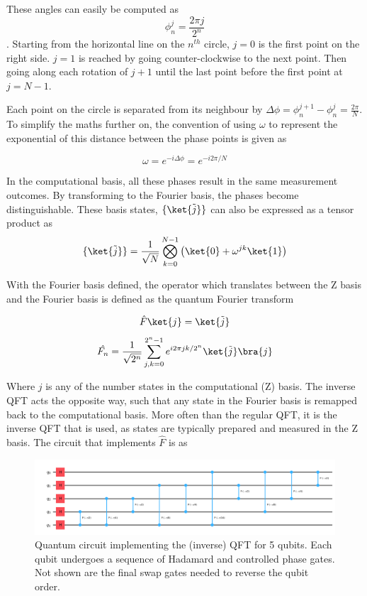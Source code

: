 \documentclass{book}
\begin{document}
These angles can easily be computed as $$\phi_n^j = \frac{2\pi j}{2^n}$$. Starting from the horizontal line on the $n^{th}$ circle, $j = 0$ is the first point on the right side. $j = 1$ is reached by going counter-clockwise to the next point. Then going along each rotation of $j+1$ until the last point before the first point at $j = N-1 $. 

Each point on the circle is separated from its neighbour by $\Delta\phi = \phi_n^{j+1} - \phi_n^j = \frac{2\pi}{N}$. To simplify the maths further on, the convention of using $\omega$ to represent the exponential of this distance between the phase points is given as 

$$ \omega = e^{-i\Delta\phi} =  e^{-i2\pi /N} $$

In the computational basis, all these phases result in the same measurement outcomes. By transforming to the Fourier basis, the phases become distinguishable. These basis states, $\{\ket{\tilde{j}}\}$ can also be expressed as a tensor product as 
$$  
\{\ket{\tilde{j}}\} = {\frac{1}{\sqrt{N}}\bigotimes_{k = 0}^{N-1}\left(\ket{0} + \omega^{jk}\ket{1} \right)}
$$

With the Fourier basis defined, the operator which translates between the Z basis and the Fourier basis is defined as the quantum Fourier transform

$$ \hat{F}\ket{j}= \ket{\tilde{j}} $$
$$ \hat{F_n} = \frac{1}{\sqrt{2^n}}\sum_{j,k =0}^{2^n-1}e^{i2\pi jk/2^n}\ket{\tilde{j}}\bra{j}  $$

Where $j$ is any of the number states in the computational (Z) basis. The inverse QFT acts the opposite way, such that any state in the Fourier basis is remapped back to the computational basis. More often than the regular QFT, it is the inverse QFT that is used, as states are typically prepared and measured in the Z basis. The circuit that implements $\hat{F}$ is as 

\begin{figure}[ht!]
    \centering
    \includegraphics[width=1.0\textwidth]{Images/F5_circuit.png}
    \caption{Quantum circuit implementing the (inverse) QFT for 5 qubits. Each qubit undergoes a sequence of Hadamard and controlled phase gates. Not shown are the final swap gates needed to reverse the qubit order.}
    \label{fig:qft_circuit}
\end{figure}
\end{document}
